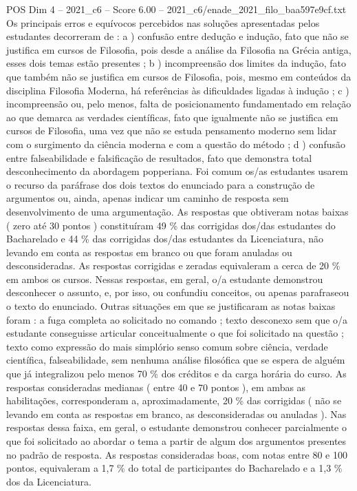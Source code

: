 \begin{textsample}{POS Dim 4 – 2021\_c6 – Score 6.00 – 2021\_c6/enade\_2021\_filo\_baa597e9cf.txt}
Os principais erros e equívocos percebidos nas soluções apresentadas pelos estudantes decorreram de : a ) confusão entre dedução e indução, fato que não se justifica em cursos de Filosofia, pois desde a análise da Filosofia na Grécia antiga, esses dois temas estão presentes ; b ) incompreensão dos limites da indução, fato que também não se justifica em cursos de Filosofia, pois, mesmo em conteúdos da disciplina Filosofia Moderna, há referências às dificuldades ligadas à indução ; c ) incompreensão ou, pelo menos, falta de posicionamento fundamentado em relação ao que demarca as verdades científicas, fato que igualmente não se justifica em cursos de Filosofia, uma vez que não se estuda pensamento moderno sem lidar com o surgimento da ciência moderna e com a questão do método ; d ) confusão entre falseabilidade e falsificação de resultados, fato que demonstra total desconhecimento da abordagem popperiana.
Foi comum os/as estudantes usarem o recurso da paráfrase dos dois textos do enunciado para a construção de argumentos ou, ainda, apenas indicar um caminho de resposta sem desenvolvimento de uma argumentação.
As respostas que obtiveram notas baixas ( zero até 30 pontos ) constituíram 49 \% das corrigidas dos/das estudantes do Bacharelado e 44 \% das corrigidas dos/das estudantes da Licenciatura, não levando em conta as respostas em branco ou que foram anuladas ou desconsideradas.
As respostas corrigidas e zeradas equivaleram a cerca de 20 \% em ambos os cursos.
Nessas respostas, em geral, o/a estudante demonstrou desconhecer o assunto, e, por isso, ou confundiu conceitos, ou apenas parafraseou o texto do enunciado.
Outras situações em que se justificaram as notas baixas foram : a fuga completa ao solicitado no comando ; texto desconexo sem que o/a estudante conseguisse articular conceitualmente o que foi solicitado na questão ; texto como expressão do mais simplório senso comum sobre ciência, verdade científica, falseabilidade, sem nenhuma análise filosófica que se espera de alguém que já integralizou pelo menos 70 \% dos créditos e da carga horária do curso.
As respostas consideradas medianas ( entre 40 e 70 pontos ), em ambas as habilitações, corresponderam a, aproximadamente, 20 \% das corrigidas ( não se levando em conta as respostas em branco, as desconsideradas ou anuladas ).
Nas respostas dessa faixa, em geral, o estudante demonstrou conhecer parcialmente o que foi solicitado ao abordar o tema a partir de algum dos argumentos presentes no padrão de resposta.
As respostas consideradas boas, com notas entre 80 e 100 pontos, equivaleram a 1,7 \% do total de participantes do Bacharelado e a 1,3 \% dos da Licenciatura.

\end{textsample}
